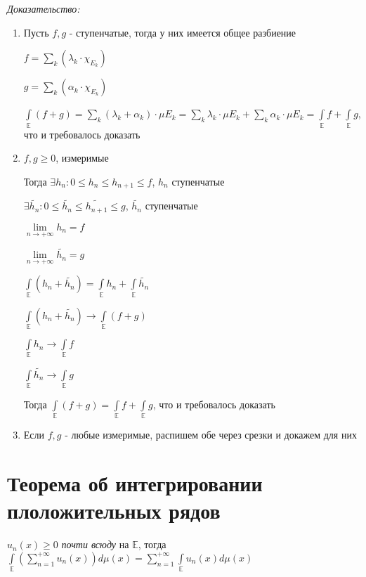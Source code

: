 \documentclass[paper=a4, fontsize=13.2pt]{article}
\begin{document}
\emph{Доказательство:}

\begin{enumerate}
	\item Пусть $f, g$ - ступенчатые, тогда у них имеется общее разбиение

	$f = \sum\limits_{k}(\lambda_k \cdot \chi_{E_k})$

	$g = \sum\limits_{k}(\alpha_k \cdot \chi_{E_k})$

	$\int\limits_{\mathds{E}} (f + g) = \sum\limits_k (\lambda_k + \alpha_k) \cdot \mu E_k = \sum\limits_k \lambda_k \cdot \mu E_k + \sum\limits_k \alpha_k \cdot \mu E_k = \int\limits_{\mathds{E}} f + \int\limits_{\mathds{E}} g$, что и требовалось доказать

	\item $f, g \geqslant 0$, измеримые

	Тогда $\exists h_n: 0 \leqslant h_n \leqslant h_{n + 1} \leqslant f$, $h_n$ ступенчатые

	$\exists \widetilde{h_n}: 0 \leqslant \widetilde{h_n} \leqslant \widetilde{h_{n + 1}} \leqslant g$, $\widetilde{h_n}$ ступенчатые

	$\lim\limits_{n \rightarrow +\infty} h_n = f$

	$\lim\limits_{n \rightarrow +\infty} \widetilde{h_n} = g$

	$\int\limits_{\mathds{E}} (h_n + \widetilde{h_n}) = \int\limits_{\mathds{E}} h_n + \int\limits_{\mathds{E}} \widetilde{h_n}$

	$\int\limits_{\mathds{E}} (h_n + \widetilde{h_n}) \rightarrow \int\limits_{\mathds{E}} (f + g)$

	$\int\limits_{\mathds{E}} h_n \rightarrow \int\limits_{\mathds{E}} f$

	$\int\limits_{\mathds{E}} \widetilde{h_n} \rightarrow \int\limits_{\mathds{E}} g$

	Тогда $\int\limits_{\mathds{E}} (f + g) = \int\limits_{\mathds{E}} f + \int\limits_{\mathds{E}} g$, что и требовалось доказать

	\item
	Если $f, g$ - любые измеримые, распишем обе через срезки и докажем для них
\end{enumerate}

\section{Теорема об интегрировании плоложительных рядов}
$u_n(x) \geq 0$ \textit{почти всюду} на $\mathds{E}$, тогда
$\int\limits_{\mathds{E}} (\sum\limits_{n=1}^{+\infty}u_n(x))d\mu(x) =
\sum\limits_{n=1}^{+\infty} \int\limits_{\mathds{E}} u_n(x)d\mu(x)$
\end{document}

